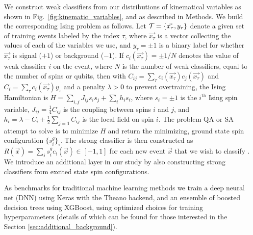 We construct weak classifiers from our distributions of kinematical variables as shown in Fig.~\ref{fig:kinematic_variables}, and as described in Methods. We build the corresponding Ising problem as follows\cite{Pudenz:2013kx}. Let $\mathcal{T} = \{\vec{x_\tau}, y_\tau\}$ denote a given set of training events labeled by the index ${\tau}$, where $\vec{x_\tau}$ is a vector collecting the values of each of the variables we use, and $y_\tau =\pm 1$ is a binary label for whether $\vec{x_\tau}$ is signal ($+1$) or background ($-1$).  If $c_i(\vec{x_\tau})=\pm 1/N$ denotes the value of weak classifier $i$ on the event, where $N$ is the number of weak classifiers, equal to the number of spins or qubits, then with $C_{ij} = \sum_\tau c_i(\vec{x_\tau})c_j(\vec{x_\tau})$ and $C_i = \sum_\tau c_i(\vec{x_\tau}) y_\tau$ and a penalty $\lambda>0$ to prevent overtraining, the Ising Hamiltonian is $H = \sum_{i,j} J_{ij} s_i s_j + \sum_i h_i  s_i$, where $s_i=\pm 1$ is the $i^\textrm{th}$ Ising spin variable, $J_{ij} = \frac{1}{4} C_{ij}$ is the coupling between spins $i$ and $j$, and $h_i =  \lambda-C_i+\frac{1}{2}\sum_{j=1} C_{ij}$ is the local field on spin $i$. The problem QA or SA attempt to solve is to minimize $H$ and return the minimizing, ground state spin configuration $\{s^g_i\}_i$. The strong classifier is then constructed as $R(\vec{x}) = \sum_i s^g_i c_i(\vec{x})\in[-1,1]$ for each new event $\vec{x}$ that we wish to classify \cite{Pudenz:2013kx}. We introduce an additional layer in our study by also constructing strong classifiers from excited state spin configurations.


As benchmarks for traditional machine learning methods we train a deep neural net (DNN) using Keras\cite{keras} with the Theano backend,\cite{2016arXiv160502688full} and  an ensemble of boosted decision trees using XGBoost\cite{xgboost}, using optimized choices for training hyperparameters (details of which can be found for those interested in the Section \ref{sec:additional_background}).


